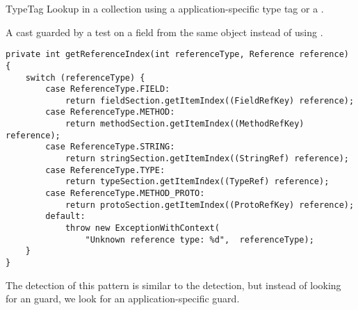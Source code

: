 \begin{pattern}{TypeTag}
Lookup in a collection using a application-specific type tag or a
.

A cast guarded by a test on a field from the same object instead of
using .

\instances{}

\begin{verbatim}
private int getReferenceIndex(int referenceType, Reference reference) {
    switch (referenceType) {
        case ReferenceType.FIELD:
            return fieldSection.getItemIndex((FieldRefKey) reference);
        case ReferenceType.METHOD:
            return methodSection.getItemIndex((MethodRefKey) reference);
        case ReferenceType.STRING:
            return stringSection.getItemIndex((StringRef) reference);
        case ReferenceType.TYPE:
            return typeSection.getItemIndex((TypeRef) reference);
        case ReferenceType.METHOD_PROTO:
            return protoSection.getItemIndex((ProtoRefKey) reference);
        default:
            throw new ExceptionWithContext(
                "Unknown reference type: %d",  referenceType);
    }
}
\end{verbatim}

\detection{}
The detection of this pattern is similar to the  detection, but instead of looking for an  guard, we look for an application-specific guard.

\discussion{}

\related{}

\end{pattern}